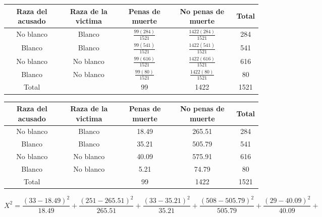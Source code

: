 \documentclass{article}
\begin{document}
\begin{table}[ht]
    \centering
    \begin{tabular}{|c|c|c|c|c|}
        \hline
        Raza del acusado & Raza de la victima & Penas de muerte        & No penas de muerte       & Total \\
        \hline
        No blanco        & Blanco             & $\frac{99(284)}{1521}$ & $\frac{1422(284)}{1521}$ & 284   \\
        Blanco           & Blanco             & $\frac{99(541)}{1521}$ & $\frac{1422(541)}{1521}$ & 541   \\
        No blanco        & No blanco          & $\frac{99(616)}{1521}$ & $\frac{1422(616)}{1521}$ & 616   \\
        Blanco           & No blanco          & $\frac{99(80)}{1521}$  & $\frac{1422(80)}{1521}$  & 80    \\
        \hline
        Total            &                    & 99                     & 1422                     & 1521  \\
        \hline
    \end{tabular}
\end{table}

\newpage

\begin{table}[ht]
    \centering
    \begin{tabular}{|c|c|c|c|c|}
        \hline
        Raza del acusado & Raza de la victima & Penas de muerte & No penas de muerte & Total \\
        \hline
        No blanco        & Blanco             & 18.49           & 265.51             & 284   \\
        Blanco           & Blanco             & 35.21           & 505.79             & 541   \\
        No blanco        & No blanco          & 40.09           & 575.91             & 616   \\
        Blanco           & No blanco          & 5.21            & 74.79              & 80    \\
        \hline
        Total            &                    & 99              & 1422               & 1521  \\
        \hline
    \end{tabular}
\end{table}

\[
    X^2 = \frac{(33-18.49)^2}{18.49} + \frac{(251-265.51)^2}{265.51} + \frac{(33-35.21)^2}{35.21} + \frac{(508-505.79)^2}{505.79} + \frac{(29-40.09)^2}{40.09} +
\]
\end{document}
